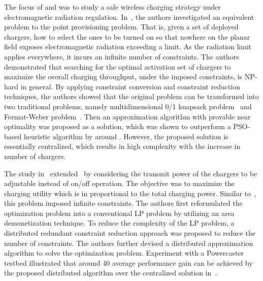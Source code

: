 \documentclass[twocolumn,10pt]{IEEEtran}
\begin{document}
The focus of \cite{H.2014Dai} and \cite{HDai2014} was to study a safe wireless charging strategy under electromagnetic radiation regulation.
In~\cite{H.2014Dai}, the authors investigated an equivalent problem to the point provisioning problem. That is, given a set of deployed chargers, how to select the ones to be turned on so that nowhere on the planar field exposes electromagnetic radiation exceeding a limit. As the radiation limit applies everywhere, it incurs an infinite number of constraints. The authors demonstrated that searching for the optimal activation set of chargers to maximize the overall charging throughput, under the imposed constraints, is NP-hard in general.
By applying constraint conversion and constraint reduction techniques, the authors showed that the original problem can be transformed into two traditional problems, namely multidimensional 0/1 knapsack problem~\cite{A.2004Freville} and Fermat-Weber problem~\cite{P.1975Hurter}. Then an approximation algorithm with provable near optimality was proposed as a solution, which was shown to outperform a PSO-based heuristic algorithm by around . However, the proposed solution is essentially centralized, which results in high complexity with the increase in number of chargers.

The study in~\cite{HDai2014} extended~\cite{H.2014Dai} by considering the transmit power of the chargers to be adjustable instead of on/off operation. The objective was to maximize the charging utility which is in proportional to the total charging power. Similar to~\cite{H.2014Dai}, this problem imposed infinite constraints. The authors first reformulated the optimization problem into a conventional LP problem by utilizing an area demonetization technique. To reduce the complexity of the LP problem, a distributed redundant constraint reduction approach was proposed to reduce the number of constraints. The authors further devised a distributed approximation algorithm to solve the optimization problem.  Experiment with a Powercaster testbed illustrated that around 40 average performance gain can be achieved by the proposed distributed algorithm over the centralized solution in~\cite{H.2014Dai}.
\end{document}
